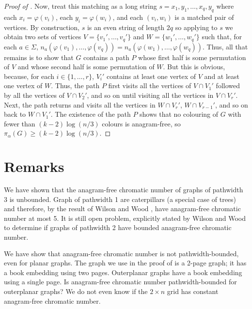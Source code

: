 \documentclass{patmorin}
\begin{document}
\begin{proof}[Proof of ]
Now, treat this matching as a long string $s=x_1,y_1,\ldots,x_q,y_q$
where each $x_i=\varphi(v_i)$, each $y_i=\varphi(w_i)$, and each
$(v_i,w_i)$ is a matched pair of vertices.  
By construction, $s$ is an even string of length $2q$ so
applying
 to $s$ we obtain two sets of vertices
$V=\{v_1',\ldots,v_q'\}$ and $W=\{w_1',\ldots,w_q'\}$ such that, 
for each $a\in\Sigma$,
$n_a(\varphi(v_1),\ldots,\varphi(v_q))=n_a(\varphi(w_1),\ldots,\varphi(w_q))$.
Thus, all that remains is to show that $G$ contains a path $P$ whose first
half is some permutation of $V$ and whose second half
is some permutation of $W$.  But this is obvious, because,
for each $i\in\{1,\ldots,r\}$, $V_i'$ contains at least one vertex of $V$
and at least one vertex of $W$.  Thus, the path $P$ first visits all the
vertices of $V\cap V_1'$ followed by all the vertices of $V\cap V_2'$,
and so on until visiting all the vertices in $V\cap V_r'$. Next, the path
returns and visits all the vertices in $W\cap V_r'$, $W\cap V_{r-1}'$,
and so on back to $W\cap V_1'$.  The existence of the path $P$ shows
that no colouring of $G$ with fewer than $(k-2)\log(n/3)$ colours is anagram-free, so $\pi_\alpha(G) \ge (k-2)\log(n/3)$.
\end{proof}

\section{Remarks}

We have shown that the anagram-free chromatic number of graphs of
pathwidth 3 is unbounded. Graph of pathwidth 1 are caterpillars (a
special case of trees) and therefore, by the result of Wilson and
Wood \cite{wilson.wood:anagram-free}, have anagram-free chromatic number at
most 5.  It is still open problem, explicitly stated by Wilson and Wood
to determine if graphs of pathwidth 2 have bounded
anagram-free chromatic number.

We have show that anagram-free chromatic number is not pathwidth-bounded,
even for planar graphs.  The graph we use in the proof of 
is a 2-page graph; it has a book embedding using two pages.  Outerplanar
graphs have a book embedding using a single page.  Is anagram-free
chromatic number pathwidth-bounded for outerplanar graphs?  We do not even know if the $2\times n$ grid has constant anagram-free chromatic number.
\end{document}
